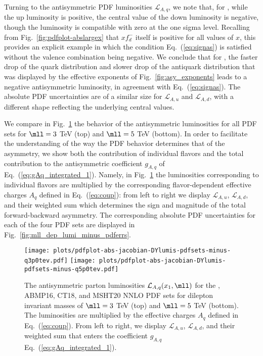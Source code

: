 Turning to the antisymmetric PDF luminosities $\mathcal{L}_{A,q}$,
we note  that, for , while the up luminosity is
positive, the central value of the down luminosity is negative, though
the luminosity is compatible with zero at the one sigma level.
%
Recalling
from Fig.~\ref{fig:pdfplot-abslargex} that $xf_{d}^-$ itself is
positive for all values of $x$,  this provides an explicit example in
which the condition Eq.~(\ref{eq:signas}) is satisfied without the valence
combination being negative.
%
We conclude that for , the faster
drop of the quark distribution and slower drop of the antiquark
distribution that was displayed by the effective exponents of
Fig.~\ref{fig:asy_exponents} leads to a negative antisymmetric
luminosity, in agreement with Eq.~(\ref{eq:signas}).
The absolute PDF uncertainties are of a similar size for
$\mathcal{L}_{A,u}$ and $\mathcal{L}_{A,d}$, with a different shape
reflecting the underlying central values.

We compare
in Fig.~\ref{fig:mll_dep_lumi_minus}
the behavior of the antisymmetric luminosities for all PDF
sets for $\mll=3$ TeV (top) and $\mll=5$ TeV (bottom).
%
In order to facilitate the understanding of the way the PDF behavior
determines that of the asymmetry, we show both the contribution of
individual flavors and the total contribution
to the antisymmetric coefficient $g_{A,q}$ of
Eq.~(\ref{eq:gAq_integrated_1}). Namely, in
Fig.~\ref{fig:mll_dep_lumi_minus} the luminosities corresponding to
individual flavors are multiplied by the corresponding flavor-dependent
effective charges $A_q$ defined in Eq.~(\ref{eq:coup}):
from left to right we display $\mathcal{L}_{A,u}$,  $\mathcal{L}_{A,d}$,
and their weighted sum
 which determines
the sign and magnitude of the total forward-backward asymmetry.
%
The corresponding absolute PDF uncertainties for each of the four PDF sets
are displayed in  Fig.~\ref{fig:mll_dep_lumi_minus_pdferrs}.

\begin{figure}[!t]
 \centering
 \texttt{[image: plots/pdfplot-abs-jacobian-DYlumis-pdfsets-minus-q3p0tev.pdf]}
 \texttt{[image: plots/pdfplot-abs-jacobian-DYlumis-pdfsets-minus-q5p0tev.pdf]}
 \caption{The antisymmetric 
   parton luminosities $\mathcal{L}_{A,q}(x_1,\mll)$ for the , ABMP16,
   CT18, and MSHT20 NNLO PDF sets for dilepton
   invariant masses of
   $\mll=3$ TeV (top) and $\mll=5$ TeV (bottom).
   The luminosities are multiplied by the effective charges
   $A_q$ defined in Eq.~(\ref{eq:coup}).
   From left to right, we display $\mathcal{L}_{A,u}$,  $\mathcal{L}_{A,d}$,
   and their weighted sum that enters the  coefficient $g_{A,q}$ Eq.~(\ref{eq:gAq_integrated_1}).
    }    
 \label{fig:mll_dep_lumi_minus}
\end{figure}


